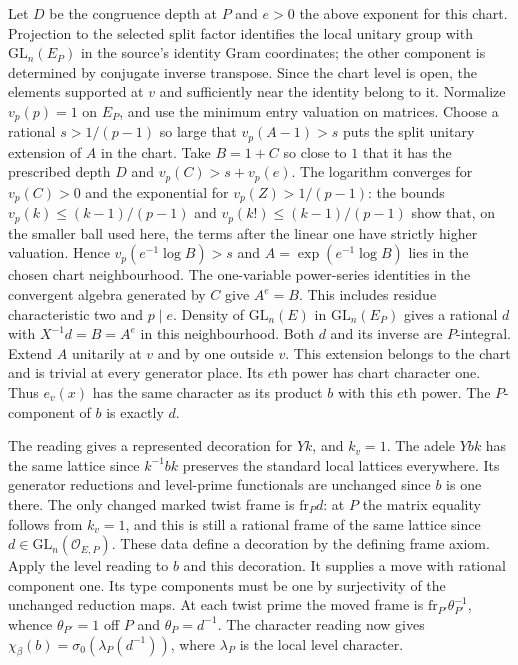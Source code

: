 Let $D$ be the congruence depth at $P$ and $e>0$ the above exponent
for this chart. Projection to the selected split factor identifies
the local unitary group with $\mathrm{GL}_n(E_P)$ in the source's
identity Gram coordinates; the other component is determined by
conjugate inverse transpose. Since the chart level is open, the
elements supported at $v$ and sufficiently near the identity belong
to it. Normalize $v_p(p)=1$ on $E_P$, and use the minimum entry
valuation on matrices. Choose a rational $s>1/(p-1)$ so large that
$v_p(A-1)>s$ puts the split unitary extension of $A$ in the chart.
Take $B=1+C$ so close to $1$ that it has the prescribed depth $D$
and $v_p(C)>s+v_p(e)$. The logarithm converges for $v_p(C)>0$ and
the exponential for $v_p(Z)>1/(p-1)$: the bounds
$v_p(k)\le(k-1)/(p-1)$ and $v_p(k!)\le(k-1)/(p-1)$ show that,
on the smaller ball used here, the terms after the linear one have
strictly higher valuation. Hence
$v_p(e^{-1}\log B)>s$ and $A=\exp(e^{-1}\log B)$ lies in the
chosen chart neighbourhood. The one-variable power-series identities
in the convergent algebra generated by $C$ give $A^e=B$.
This includes residue characteristic two and $p\mid e$.
Density of
$\mathrm{GL}_n(E)$ in $\mathrm{GL}_n(E_P)$ gives a rational $d$ with
$X^{-1}d=B=A^e$ in this neighbourhood. Both $d$ and its inverse
are $P$-integral. Extend $A$ unitarily at $v$ and by one outside $v$.
This extension belongs to the chart and is trivial at every generator
place. Its $e$th power has chart character one. Thus $e_v(x)$ has the
same character as its product $b$ with this $e$th power.
The $P$-component of $b$ is exactly $d$.

The reading gives a represented decoration for $Yk$, and $k_v=1$.
The adele $Ybk$ has the same lattice since $k^{-1}bk$ preserves the
standard local lattices everywhere. Its generator reductions and
level-prime functionals are unchanged since $b$ is one there. The
only changed marked twist frame is $\mathrm{fr}_P d$:
at $P$ the matrix equality follows from $k_v=1$, and this is still
a rational frame of the same lattice since $d\in\mathrm{GL}_n(\mathcal
O_{E,P})$. These data define a decoration by the defining frame axiom.
Apply the level reading to $b$ and this decoration. It supplies
a move with rational component one. Its type components must be
one by surjectivity of the unchanged reduction maps. At each twist
prime the moved frame is $\mathrm{fr}_{P'}\theta_{P'}^{-1}$, whence
$\theta_{P'}=1$ off $P$ and $\theta_P=d^{-1}$. The character reading
now gives $\chi_\beta(b)=\sigma_0(\lambda_P(d^{-1}))$, where
$\lambda_P$ is the local level character.

